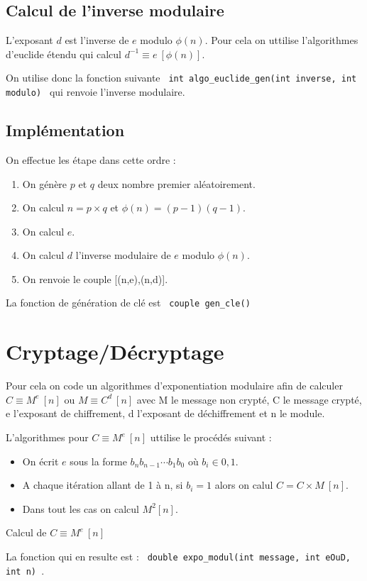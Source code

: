 \documentclass[10pt,a4paper]{article}
\begin{document}
\subsection*{Calcul de l'inverse modulaire}
L'exposant $d$ est l'inverse de $e$ modulo $\phi(n)$. Pour cela on uttilise l'algorithmes d'euclide étendu qui calcul $d^{-1}\equiv e\ [\phi(n)]$.

On utilise donc la fonction suivante \verb| int algo_euclide_gen(int inverse, int modulo) | qui renvoie l'inverse modulaire.
\subsection*{Implémentation}
On effectue les étape dans cette ordre :
\begin{enumerate}
\item On génère $p$ et $q$ deux nombre premier aléatoirement.
\item On calcul $n=p\times q$ et $\phi(n)=(p-1)(q-1)$.
\item On calcul $e$.
\item On calcul $d$ l'inverse modulaire de $e$ modulo $\phi(n)$.
\item On renvoie le couple [(n,e),(n,d)].\\
\end{enumerate}
La fonction de génération de clé est \verb| couple gen_cle() |
\section{Cryptage/Décryptage}
Pour cela on code un algorithmes d'exponentiation modulaire afin de calculer $C \equiv M^e\ [n]$ ou $M \equiv C^d\ [n]$ avec M le message non crypté, C le message crypté, e l'exposant de chiffrement, d l'exposant de déchiffrement et n le module.

L'algorithmes pour $C \equiv M^e\ [n]$ uttilise le procédés suivant :
\begin{itemize}
\item On écrit $e$ sous la forme $b_nb_{n-1}\cdots b_1b_0$ où $b_i\in{0,1}$.
\item A chaque itération allant de 1 à n, si $b_i=1$ alors on calul $C = C\times M\ [n]$.
\item Dans tout les cas on calcul $M^2 [n]$.\\
\end{itemize}
    \begin{algorithm}
    	\caption{Calcul de $C \equiv M^e\ [n]$}
    \end{algorithm}
La fonction qui en resulte est : \verb| double expo_modul(int message, int eOuD, int n) |.
\end{document}
